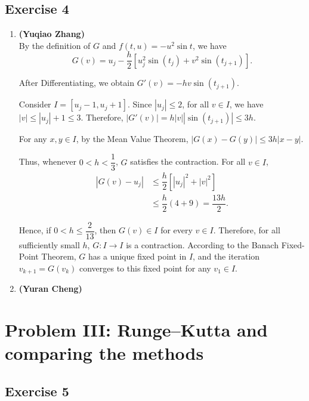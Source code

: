 \documentclass[11pt]{article}
\begin{document}
\subsection{Exercise 4}

\begin{enumerate}
    \item \textbf{(Yuqiao Zhang)}  \\ 
    By the definition of $G$ and $f(t,u)=-u^2\sin t$, we have $$G(v)=u_j-\dfrac h2\left[u_j^2\sin(t_j)+v^2\sin(t_{j+1})\right].$$

    After Differentiating, we obtain $G'(v)=-hv\sin(t_{j+1}).$

    Consider $I=[u_j-1,u_j+1]$. Since $|u_j|\le2$, for all $v\in I$, we have $|v|\le |u_j|+1\le3$. Therefore, $|G'(v)|=h|v||\sin(t_{j+1})|\le3h.$

    For any $x,y\in I$, by the Mean Value Theorem, $|G(x)-G(y)|\le3h|x-y|.$

    Thus, whenever $0<h<\dfrac13$, $G$ satisfies the contraction. For all $v\in I$,
    $$\begin{aligned}
        |G(v)-u_j|
        &\le\dfrac h2\left[|u_j|^2+|v|^2\right]\\
        &\le\dfrac h2(4+9)
        =\dfrac{13h}{2}.
    \end{aligned}$$

    Hence, if $0 < h \le \dfrac{2}{13}$, then $G(v) \in I$ for every $v\in I$. Therefore, for all sufficiently small $h$, $G:I\to I$ is a contraction. According to the Banach Fixed-Point Theorem, $G$ has a unique fixed point in $I$, and the iteration $v_{k+1}=G(v_k)$ converges to this fixed point for any $v_1\in I$.
    
    \item \textbf{(Yuran Cheng)}
\end{enumerate}

\section{Problem III: Runge–Kutta and comparing the methods}

\subsection{Exercise 5}
\end{document}
